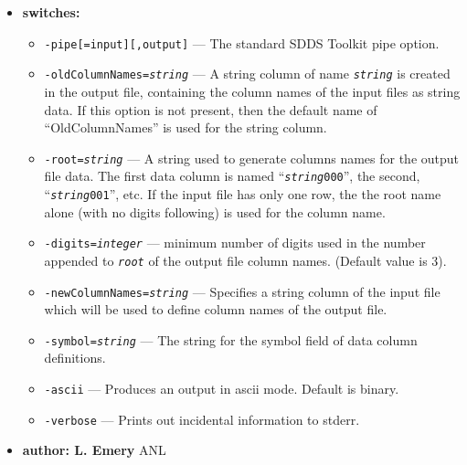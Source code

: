 \begin{itemize}
\item {\bf switches:}
%
%
    \begin{itemize}
    \item {\tt  -pipe[=input][,output]} --- The standard SDDS Toolkit pipe option.
    \item {\tt  -oldColumnNames={\em string}} --- 
        A string column of name {\tt {\em string}} is created in the output file, containing
        the column names of the input files as string data.
        If this option is not present, then the default name of ``OldColumnNames''
        is used for the string column.
    \item {\tt  -root={\em string}} ---
        A string used to generate columns names for the output file data. 
        The first data column is named ``{\tt {\em string}000}'',
        the second, ``{\tt {\em string}001}'', etc. If the input file has only one
        row, the the root name alone (with no digits following) is used for the 
        column name.
    \item {\tt  -digits={\em integer}} --- minimum number of digits used in the number 
        appended to {\tt {\em root}} of the output file column names. (Default value is 3).
    \item {\tt  -newColumnNames={\em string}} --- Specifies a string column
        of the input file which will be used to define column names
        of the output file.
    \item {\tt  -symbol={\em string}} --- The string for the symbol field of data column definitions.
    \item {\tt  -ascii}  --- Produces an output in ascii mode. Default is binary.
    \item {\tt  -verbose} --- Prints out incidental information to stderr.
    \end{itemize}
%
%
%
%
\item {\bf author: L. Emery } ANL
\end{itemize}



